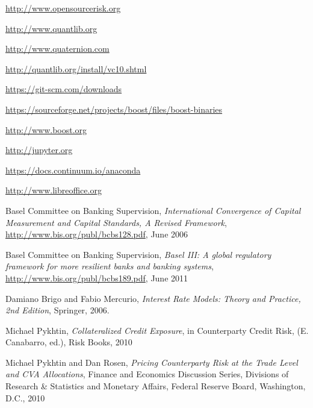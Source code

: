 \documentclass[12pt, a4paper]{article}
\begin{document}

\begin{thebibliography}{*}

 \url{http://www.opensourcerisk.org}

 \url{http://www.quantlib.org}
 
 \url{http://www.quaternion.com}

 \url{http://quantlib.org/install/vc10.shtml}


 \url{https://git-scm.com/downloads}

 \url{https://sourceforge.net/projects/boost/files/boost-binaries}

 \url{http://www.boost.org}

 \url{http://jupyter.org}

 \url{https://docs.continuum.io/anaconda}

 \url{http://www.libreoffice.org}


 Basel Committee on Banking Supervision, {\em International Convergence of Capital Measurement and
    Capital Standards, A Revised Framework}, \url{http://www.bis.org/publ/bcbs128.pdf}, June 2006

 Basel Committee on Banking Supervision, {\em Basel III: A global regulatory framework for more
    resilient banks and banking systems}, \url{http://www.bis.org/publ/bcbs189.pdf}, June 2011

 Damiano Brigo and Fabio Mercurio, {\em Interest Rate Models: Theory and Practice, 2nd Edition},
  Springer, 2006.

 Michael Pykhtin, {\em Collateralized Credit Exposure}, in Counterparty Credit Risk, (E. Canabarro,
  ed.), Risk Books, 2010

 Michael Pykhtin and Dan Rosen, {\em Pricing Counterparty Risk at the Trade Level and CVA
    Allocations}, Finance and Economics Discussion Series, Divisions of Research \& Statistics and Monetary Affairs,
  Federal Reserve Board, Washington, D.C., 2010


\end{thebibliography}
\end{document}
